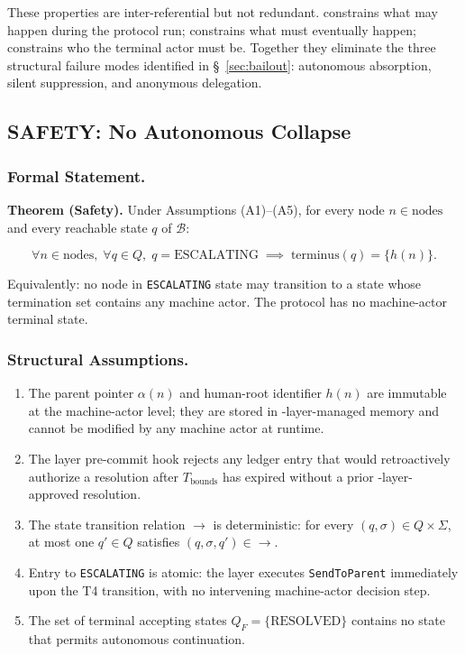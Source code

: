 These properties are inter-referential but not redundant. \SAFETY{} constrains what may happen during the protocol run; \LIVENESS{} constrains what must eventually happen; \ACCOUNTABILITY{} constrains who the terminal actor must be. Together they eliminate the three structural failure modes identified in \S~\ref{sec:bailout}: autonomous absorption, silent suppression, and anonymous delegation.

\subsection{SAFETY: No Autonomous Collapse}

\subsubsection{Formal Statement.}

\begin{bluebox}
\textbf{Theorem (Safety).} Under Assumptions (A1)--(A5), for every node $n \in \text{nodes}$ and every reachable state $q$ of $\mathcal{B}$:

\[
\forall n \in \text{nodes},\; \forall q \in Q,\; q = \text{ESCALATING} \;\implies\; \text{terminus}(q) = \{h(n)\}.
\tag{SAFETY}
\]

Equivalently: no \bxthree{} node in \texttt{ESCALATING} state may transition to a state whose termination set contains any machine actor. The protocol has no machine-actor terminal state.
\end{bluebox}

\subsubsection{Structural Assumptions.}

\begin{enumerate}
\item[(A1)] The parent pointer $\alpha(n)$ and human-root identifier $h(n)$ are immutable at the machine-actor level; they are stored in \fact-layer-managed memory and cannot be modified by any machine actor at runtime.
\item[(A2)] The \fact{} layer pre-commit hook rejects any ledger entry that would retroactively authorize a resolution after $T_{\text{bounds}}$ has expired without a prior \fact-layer-approved resolution.
\item[(A3)] The state transition relation $\rightarrow$ is deterministic: for every $(q, \sigma) \in Q \times \Sigma$, at most one $q' \in Q$ satisfies $(q, \sigma, q') \in \rightarrow$.
\item[(A4)] Entry to \texttt{ESCALATING} is atomic: the \fact{} layer executes \texttt{SendToParent} immediately upon the T4 transition, with no intervening machine-actor decision step.
\item[(A5)] The set of terminal accepting states $Q_F = \{\text{RESOLVED}\}$ contains no state that permits autonomous continuation.
\end{enumerate}


